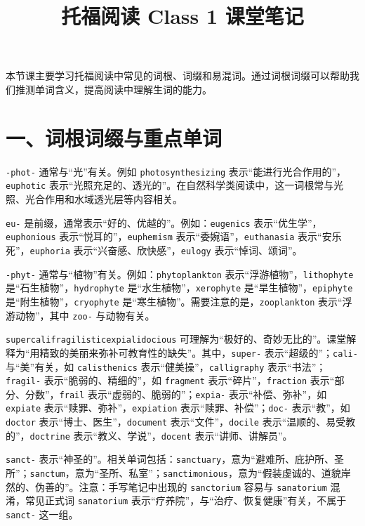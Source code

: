 \documentclass[UTF8,zihao=-4]{ctexart}
\title{\heiti 托福阅读 Class 1 课堂笔记}
\author{}
\date{}
\begin{document}
\maketitle
\thispagestyle{fancy}

本节课主要学习托福阅读中常见的词根、词缀和易混词。通过词根词缀可以帮助我们推测单词含义，提高阅读中理解生词的能力。

\section*{一、词根词缀与重点单词}

\texttt{-phot-} 通常与“光”有关。例如 \texttt{photosynthesizing} 表示“能进行光合作用的”，\texttt{euphotic} 表示“光照充足的、透光的”。在自然科学类阅读中，这一词根常与光照、光合作用和水域透光层等内容相关。

\texttt{eu-} 是前缀，通常表示“好的、优越的”。例如：\texttt{eugenics} 表示“优生学”，\texttt{euphonious} 表示“悦耳的”，\texttt{euphemism} 表示“委婉语”，\texttt{euthanasia} 表示“安乐死”，\texttt{euphoria} 表示“兴奋感、欣快感”，\texttt{eulogy} 表示“悼词、颂词”。

\texttt{-phyt-} 通常与“植物”有关。例如：\texttt{phytoplankton} 表示“浮游植物”，\texttt{lithophyte} 是“石生植物”，\texttt{hydrophyte} 是“水生植物”，\texttt{xerophyte} 是“旱生植物”，\texttt{epiphyte} 是“附生植物”，\texttt{cryophyte} 是“寒生植物”。需要注意的是，\texttt{zooplankton} 表示“浮游动物”，其中 \texttt{zoo-} 与动物有关。

\texttt{supercalifragilisticexpialidocious} 可理解为“极好的、奇妙无比的”。课堂解释为“用精致的美丽来弥补可教育性的缺失”。其中，\texttt{super-} 表示“超级的”；\texttt{cali-} 与“美”有关，如 \texttt{calisthenics} 表示“健美操”，\texttt{calligraphy} 表示“书法”；\texttt{fragil-} 表示“脆弱的、精细的”，如 \texttt{fragment} 表示“碎片”，\texttt{fraction} 表示“部分、分数”，\texttt{frail} 表示“虚弱的、脆弱的”；\texttt{expia-} 表示“补偿、弥补”，如 \texttt{expiate} 表示“赎罪、弥补”，\texttt{expiation} 表示“赎罪、补偿”；\texttt{doc-} 表示“教”，如 \texttt{doctor} 表示“博士、医生”，\texttt{document} 表示“文件”，\texttt{docile} 表示“温顺的、易受教的”，\texttt{doctrine} 表示“教义、学说”，\texttt{docent} 表示“讲师、讲解员”。

\texttt{sanct-} 表示“神圣的”。相关单词包括：\texttt{sanctuary}，意为“避难所、庇护所、圣所”；\texttt{sanctum}，意为“圣所、私室”；\texttt{sanctimonious}，意为“假装虔诚的、道貌岸然的、伪善的”。注意：手写笔记中出现的 \texttt{sanctorium} 容易与 \texttt{sanatorium} 混淆，常见正式词 \texttt{sanatorium} 表示“疗养院”，与“治疗、恢复健康”有关，不属于 \texttt{sanct-} 这一组。
\end{document}
